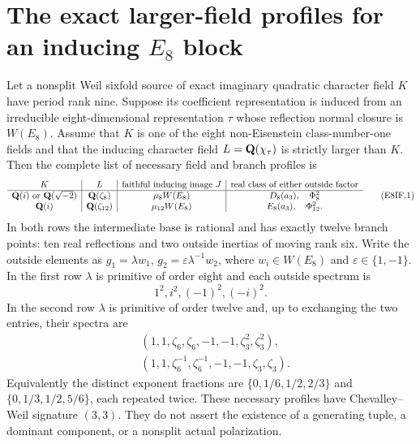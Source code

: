 \section{The exact larger-field profiles for an inducing $E_8$ block}
\label{sec:e8-inducing-fields}

\begin{theorem}[HD-E8IF1]
Let a nonsplit Weil sixfold source of exact imaginary quadratic
character field $K$ have period rank nine. Suppose its coefficient
representation is induced from an irreducible eight-dimensional
representation $\tau$ whose reflection normal closure is $W(E_8)$.
Assume that $K$ is one of the eight non-Eisenstein class-number-one
fields and that the inducing character field
$L=\mathbf Q(\chi_\tau)$ is strictly larger than $K$.
Then the complete list of necessary field and branch profiles is
\[
\begin{array}{c|c|c|c}
 K&L&\text{faithful inducing image }J&
     \text{real class of either outside factor}\\\hline
 \mathbf Q(i)\text{ or }\mathbf Q(\sqrt{-2})&\mathbf Q(\zeta_8)&
       \mu_8W(E_8)&D_8(a_3),\quad\Phi_8^2\\
 \mathbf Q(i)&\mathbf Q(\zeta_{12})&\mu_{12}W(E_8)&
       E_8(a_3),\quad\Phi_{12}^2.
\end{array}                                                    \tag{E8IF.1}
\]
In both rows the intermediate base is rational and has exactly
twelve branch points: ten real reflections and two outside inertias
of moving rank six. Write the outside elements as
$g_1=\lambda w_1$, $g_2=\varepsilon\lambda^{-1}w_2$,
where $w_i\in W(E_8)$ and $\varepsilon\in\{1,-1\}$.
In the first row $\lambda$ is primitive of order eight and each
outside spectrum is
\[
                  1^2,i^2,(-1)^2,(-i)^2.                    \tag{E8IF.2}
\]
In the second row $\lambda$ is primitive of order twelve and,
up to exchanging the two entries, their spectra are
\begin{align*}
 &(1,1,\zeta_6,\zeta_6,-1,-1,\zeta_3^2,\zeta_3^2),\\
 &(1,1,\zeta_6^{-1},\zeta_6^{-1},-1,-1,\zeta_3,\zeta_3).
\end{align*}
Equivalently the distinct exponent
fractions are $\{0,1/6,1/2,2/3\}$ and
$\{0,1/3,1/2,5/6\}$, each repeated twice.
These necessary profiles have Chevalley--Weil signature $(3,3)$.
They do not assert the existence of a generating tuple, a dominant
component, or a nonsplit actual polarization.
\end{theorem}

